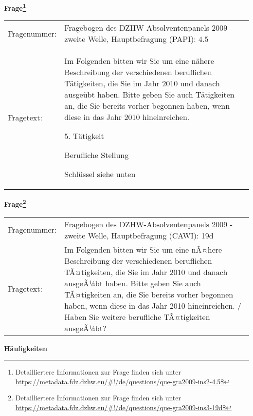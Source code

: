 				\vspace*{0.5cm}
                \noindent\textbf{Frage\footnote{Detailliertere Informationen zur Frage finden sich unter
		              \url{https://metadata.fdz.dzhw.eu/\#!/de/questions/que-gra2009-ins2-4.5$}}}\\
				\begin{tabularx}{\hsize}{@{}lX}
					Fragenummer: &
					  Fragebogen des DZHW-Absolventenpanels 2009 - zweite Welle, Hauptbefragung (PAPI):
					  4.5
 \\
					Fragetext: & Im Folgenden bitten wir Sie um eine nähere Beschreibung der verschiedenen beruflichen Tätigkeiten, die Sie im Jahr 2010 und danach ausgeübt haben. Bitte geben Sie auch Tätigkeiten an, die Sie bereits vorher begonnen haben, wenn diese in das Jahr 2010 hineinreichen.\par  5. Tätigkeit\par  Berufliche Stellung\par  Schlüssel siehe unten \\
				\end{tabularx}
				\vspace*{0.5cm}
                \noindent\textbf{Frage\footnote{Detailliertere Informationen zur Frage finden sich unter
		              \url{https://metadata.fdz.dzhw.eu/\#!/de/questions/que-gra2009-ins3-19d$}}}\\
				\begin{tabularx}{\hsize}{@{}lX}
					Fragenummer: &
					  Fragebogen des DZHW-Absolventenpanels 2009 - zweite Welle, Hauptbefragung (CAWI):
					  19d
 \\
					Fragetext: & Im Folgenden bitten wir Sie um eine nÃ¤here Beschreibung der verschiedenen beruflichen TÃ¤tigkeiten, die Sie im Jahr 2010 und danach ausgeÃ¼bt haben. Bitte geben Sie auch TÃ¤tigkeiten an, die Sie bereits vorher begonnen haben, wenn diese in das Jahr 2010 hineinreichen. / Haben Sie weitere berufliche TÃ¤tigkeiten ausgeÃ¼bt? \\
				\end{tabularx}





        		\vspace*{0.5cm}
                \noindent\textbf{Häufigkeiten}

